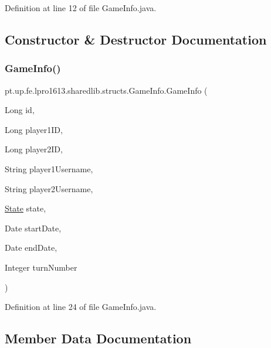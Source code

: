 Definition at line 12 of file Game\+Info.\+java.



\subsection{Constructor \& Destructor Documentation}
\hypertarget{classpt_1_1up_1_1fe_1_1lpro1613_1_1sharedlib_1_1structs_1_1_game_info_a165c0555256bbe9e74ed4b54baee07d2}{}\label{classpt_1_1up_1_1fe_1_1lpro1613_1_1sharedlib_1_1structs_1_1_game_info_a165c0555256bbe9e74ed4b54baee07d2} 
\subsubsection{\texorpdfstring{Game\+Info()}{GameInfo()}}
{\footnotesize\ttfamily pt.\+up.\+fe.\+lpro1613.\+sharedlib.\+structs.\+Game\+Info.\+Game\+Info (\begin{DoxyParamCaption}\item[{Long}]{id,  }\item[{Long}]{player1\+ID,  }\item[{Long}]{player2\+ID,  }\item[{String}]{player1\+Username,  }\item[{String}]{player2\+Username,  }\item[{\hyperlink{enumpt_1_1up_1_1fe_1_1lpro1613_1_1sharedlib_1_1structs_1_1_game_info_1_1_state}{State}}]{state,  }\item[{Date}]{start\+Date,  }\item[{Date}]{end\+Date,  }\item[{Integer}]{turn\+Number }\end{DoxyParamCaption})}



Definition at line 24 of file Game\+Info.\+java.



\subsection{Member Data Documentation}
\hypertarget{classpt_1_1up_1_1fe_1_1lpro1613_1_1sharedlib_1_1structs_1_1_game_info_a31879c76b0c3c6f4510e09e75dc07085}{}\label{classpt_1_1up_1_1fe_1_1lpro1613_1_1sharedlib_1_1structs_1_1_game_info_a31879c76b0c3c6f4510e09e75dc07085} 
